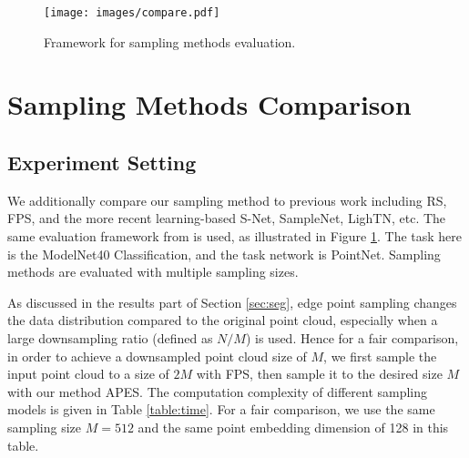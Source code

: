 \documentclass[10pt,twocolumn,letterpaper]{article}
\begin{document}
\begin{table}[t]
\centering
{}
\caption{Computation complexity of different sampling methods. Here \enquote{M} stands for million. \vspace{-0.1cm}} \label{table:time}
\end{table}

\begin{figure}[t]
    \centering
    \setlength{\abovecaptionskip}{2pt}
    \texttt{[image: images/compare.pdf]} 
    \caption{Framework for sampling methods evaluation.
    \vspace{-0.2cm}
    }
    \label{fig:compare}
\end{figure}


\section{Sampling Methods Comparison}
\label{sec:compare}
\subsection{Experiment Setting}
We additionally compare our sampling method to previous work including RS, FPS, and the more recent learning-based S-Net, SampleNet, LighTN, etc. The same evaluation framework from \cite{Dovrat2019LearningTS, Lang2020SampleNetDP, Wang2022LighTNLT} is used, as illustrated in Figure \ref{fig:compare}. The task here is the ModelNet40 Classification, and the task network is PointNet. 
Sampling methods are evaluated with multiple sampling sizes. 

As discussed in the results part of Section \ref{sec:seg}, edge point sampling changes the data distribution compared to the original point cloud, especially when a large downsampling ratio (defined as $N/M$) is used. 
Hence for a fair comparison, in order to achieve a downsampled point cloud size of $M$, we first sample the input point cloud to a size of $2M$ with FPS, then sample it to the desired size $M$ with our method APES.
The computation complexity of different sampling models is given in Table \ref{table:time}. For a fair comparison, we use the same sampling size $M = 512$ and the same point embedding dimension of 128 in this table.
\end{document}
